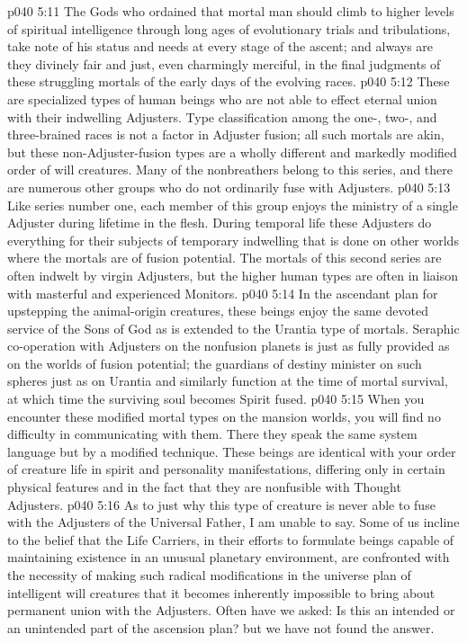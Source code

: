 \pc \vs p040 5:11 The Gods who ordained that mortal man should climb to higher levels of spiritual intelligence through long ages of evolutionary trials and tribulations, take note of his status and needs at every stage of the ascent; and always are they divinely fair and just, even charmingly merciful, in the final judgments of these struggling mortals of the early days of the evolving races.
\pc \vs p040 5:12  These are specialized types of human beings who are not able to effect eternal union with their indwelling Adjusters. Type classification among the one-, two-, and three\hyp{}brained races is not a factor in Adjuster fusion; all such mortals are akin, but these non\hyp{}Adjuster\hyp{}fusion types are a wholly different and markedly modified order of will creatures. Many of the nonbreathers belong to this series, and there are numerous other groups who do not ordinarily fuse with Adjusters.
\vs p040 5:13 Like series number one, each member of this group enjoys the ministry of a single Adjuster during lifetime in the flesh. During temporal life these Adjusters do everything for their subjects of temporary indwelling that is done on other worlds where the mortals are of fusion potential. The mortals of this second series are often indwelt by virgin Adjusters, but the higher human types are often in liaison with masterful and experienced Monitors.
\vs p040 5:14 In the ascendant plan for upstepping the animal\hyp{}origin creatures, these beings enjoy the same devoted service of the Sons of God as is extended to the Urantia type of mortals. Seraphic co\hyp{}operation with Adjusters on the nonfusion planets is just as fully provided as on the worlds of fusion potential; the guardians of destiny minister on such spheres just as on Urantia and similarly function at the time of mortal survival, at which time the surviving soul becomes Spirit fused.
\vs p040 5:15 When you encounter these modified mortal types on the mansion worlds, you will find no difficulty in communicating with them. There they speak the same system language but by a modified technique. These beings are identical with your order of creature life in spirit and personality manifestations, differing only in certain physical features and in the fact that they are nonfusible with Thought Adjusters.
\vs p040 5:16 As to just why this type of creature is never able to fuse with the Adjusters of the Universal Father, I am unable to say. Some of us incline to the belief that the Life Carriers, in their efforts to formulate beings capable of maintaining existence in an unusual planetary environment, are confronted with the necessity of making such radical modifications in the universe plan of intelligent will creatures that it becomes inherently impossible to bring about permanent union with the Adjusters. Often have we asked: Is this an intended or an unintended part of the ascension plan? but we have not found the answer.

